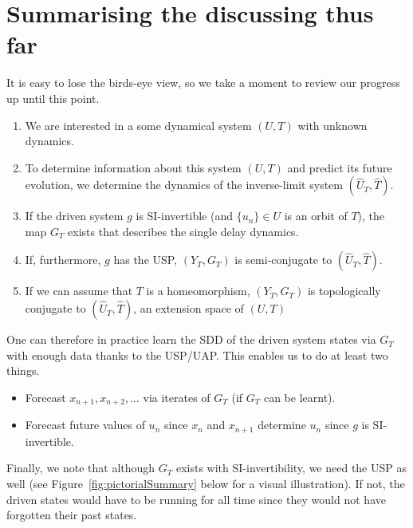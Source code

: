

\section*{Summarising the discussing thus far}

It is easy to lose the birds-eye view, so we take a moment to review our progress up until this point.

\vspace{-8mm}
\begin{enumerate}
\item We are interested in a some dynamical system $(U,T)$ with unknown dynamics.
\item To determine information about this system $(U,T)$ and predict its future evolution, we determine the dynamics of the inverse-limit system $(\widehat{U}_T, \widehat{T})$.
\item If the driven system $g$ is SI-invertible (and $\{u_n\}\in{U}$  is an orbit of $T$), the map $G_T$ exists that describes the single delay dynamics. 
\item If, furthermore, $g$ has the USP, $(Y_T, G_T)$ is semi-conjugate to $(\widehat{U}_T, \widehat{T})$.
\item If we can assume that $T$ is a homeomorphism, $(Y_T, G_T)$ is topologically conjugate to $(\widehat{U}_T, \widehat{T})$, an extension space of $(U,T)$
\end{enumerate} 

One can therefore in practice learn the SDD of the driven system states via $G_T$ with enough data thanks to the USP/UAP. This enables us to do at least two things. 
\vspace{-8mm}
\begin{itemize}
\item Forecast  $x_{n+1},x_{n+2}, \ldots$ via iterates of $G_T$ (if $G_T$ can be learnt).
\item Forecast future values of $u_n$ since $x_n$ and $x_{n+1}$ determine $u_n$ since $g$ is SI-invertible. 
\end{itemize} 


Finally, we note that although $G_T$ exists with SI-invertibility, we need the USP as well (see Figure~\ref{fig:pictorialSummary} below for a visual illustration). 
If not, the driven states would have to be running for all time since they would not have forgotten their past states. 

